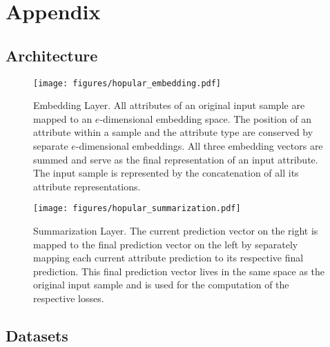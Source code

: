 \documentclass{article}
\theoremstyle{plain}
\theoremstyle{definition}
\theoremstyle{remark}
\begin{document}



\newpage{}
\appendix

\section{Appendix}
\renewcommand\thefigure{\thesection.\arabic{figure}}
\renewcommand\thetable{\thesection.\arabic{table}}

\subsection{Architecture} \label{sec:architecture_appendix}

\begin{figure}[h]
    \centering
    \texttt{[image: figures/hopular\_embedding.pdf]}
    \caption{Embedding Layer. All attributes of an original input sample
    are mapped to an $e$-dimensional embedding space. The position of an
    attribute within a sample and the attribute type are conserved by separate $e$-dimensional embeddings. All
    three embedding vectors are summed and serve as the final
    representation of an input attribute. The input sample is represented
    by the concatenation of all its attribute representations.}
    \label{fig:hopular_embedding}
\end{figure}

\begin{figure}[h]
    \centering
    \texttt{[image: figures/hopular\_summarization.pdf]}
    \caption{Summarization Layer. The current prediction vector on the right is mapped to the final prediction vector on the left by separately mapping each current attribute
    prediction to its respective final prediction. This final prediction vector lives
    in the same space as the original input sample and is used for the 
    computation of the respective losses.}
    \label{fig:hopular_summarization}
\end{figure}

\subsection{Datasets} \label{sec:dataset_explanation}
\end{document}
